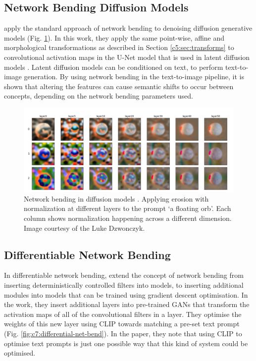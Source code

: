  \subsection{Network Bending Diffusion Models}
 \label{c7:subsec:netbend-diffusion}

 \cite{dzwonczyk2024network} apply the standard approach of network bending to denoising diffusion generative models  (Fig. \ref{fig:c7:net-bend-diffusion}).
 In this work, they apply the same point-wise, affine and morphological transformations as described in Section \ref{c5:sec:transforms} to convolutional activation maps in the U-Net model \citep{ronneberger2015u} that is used in latent diffusion models \citep{rombach2022high}. 
 Latent diffusion models can be conditioned on text, to perform text-to-image generation.
 By using network bending in the text-to-image pipeline, it is shown that altering the features can cause semantic shifts to occur between concepts, depending on the network bending parameters used.

\begin{figure}[!htb]
    \centering
    \captionsetup{justification=centering}
    \includegraphics[width=1\textwidth]{figures/c7_impact/net-bend-technical/net-bend-diffusion.png}
    \caption[Network bending in diffusion models]{Network bending in diffusion models \citep{dzwonczyk2024network}. Applying erosion with normalization at different layers to the prompt `a floating orb'. Each column shows normalization happening across a different dimension. Image courtesy of the Luke Dzwonczyk.}
    \label{fig:c7:net-bend-diffusion}
\end{figure}

\subsection{Differentiable Network Bending}

In differentiable network bending, \cite{aldegheri2023hacking} extend the concept of network bending from inserting deterministically controlled filters into models, to inserting additional modules into models that can be trained using gradient descent optimisation.
In the work, they insert additional layers into pre-trained GANs that transform the activation maps of all of the convolutional filters in a layer.
They optimise the weights of this new layer using CLIP \citep{radford2021learning} towards matching a pre-set text prompt  (Fig. \ref{fig:c7:differential-net-bend}).
In the paper, they note that using CLIP to optimise text prompts is just one possible way that this kind of system could be optimised. 

